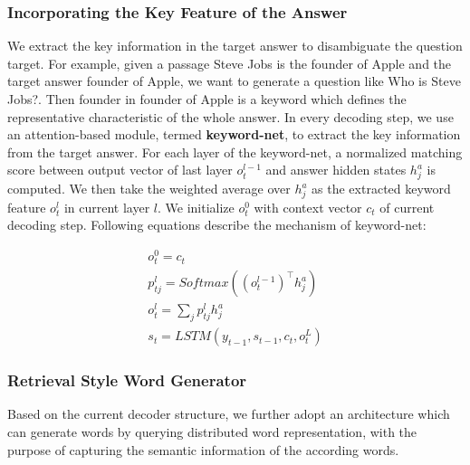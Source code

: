 \documentclass[letterpaper]{article} %
\begin{document}
\subsubsection{Incorporating the Key Feature of the Answer} 
We extract the key information in the target answer to disambiguate the question target. For example, given a passage Steve Jobs is the founder of Apple and the target answer founder of Apple, we want to generate a question like Who is Steve Jobs?. Then founder in founder of Apple is a keyword which defines the representative characteristic of the whole answer. In every decoding step, we use an attention-based module, termed \textbf{keyword-net}, to extract the key information from the target answer. For each layer of the keyword-net, a normalized matching score between output vector of last layer  \(o_t^{l-1}\) and answer hidden states \(h^a_j\) is computed. We then take the weighted average over \(h^a_j\) as the extracted keyword feature \(o^l_t\) in current layer \(l\). We initialize \(o^0_t\) with context vector \(c_t\) of current decoding step. Following equations describe the mechanism of keyword-net:
% 
%      
% 

\begin{gather}
o^0_t = c_t \label{eq_14} \\
p^l_{tj} = Softmax((o^{l-1}_t)^{\top}h^a_{j}) \label{eq_15} \\
o_t^l = \sum_{j}p^l_{tj}h^a_{j}  \label{eq_16} \\
s_t = LSTM(y_{t-1}, s_{t-1}, c_t, o_t^L) \label{eq_17} 
\end{gather}

% 
%       
% 

\subsubsection{Retrieval Style Word Generator} 
Based on the current decoder structure, we further adopt an architecture which can generate words by querying distributed word representation, with the purpose of capturing the semantic information of the according words.
\end{document}
